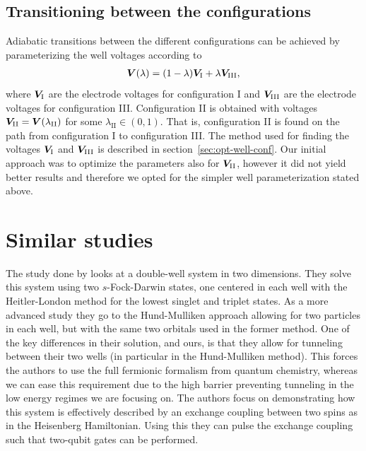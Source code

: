 \documentclass[twocolumn,superscriptaddress,unsortedaddress,
 amsmath,amssymb,
 aps,
]{revtex4-2}
\begin{document}
    \subsection{Transitioning between the configurations}
        Adiabatic transitions between the different configurations can be achieved by parameterizing the well voltages according to 
        \begin{align}
            \vb*{V}(\lambda) = (1-\lambda)\vb*{V}_\mathrm{I} + \lambda\vb*{V}_\mathrm{III},
            \label{eq:well-parameterization}
        \end{align}
        where $\vb*{V}_\mathrm{I}$ are the electrode voltages for configuration I and $\vb*{V}_\mathrm{III}$ are the electrode voltages for configuration III. Configuration II is obtained with voltages $\vb*{V}_\mathrm{II} = \vb*{V}(\lambda_\mathrm{II})$ for some $\lambda_\mathrm{II}\in(0,1)$. 
        That is, configuration II is found on the path from configuration I to configuration III. The method used for finding the voltages $\vb*{V}_\mathrm{I}$ and $\vb*{V}_\mathrm{III}$ is described in section~\ref{sec:opt-well-conf}. Our initial approach was to optimize the parameters also for $\vb*{V}_\mathrm{II}$, however it did not yield better results and therefore we opted for the simpler well parameterization stated above.
    

\section{Similar studies}
    The study done by \citet{Burkard1999} looks at a double-well system
    in two dimensions.
    They solve this system using two $s$-Fock-Darwin states,
    one centered in each well with the Heitler-London method for the
    lowest singlet and triplet states.
    As a more advanced study they go to the Hund-Mulliken approach
    allowing for two particles in each well, but with the same
    two orbitals used in the former method.
    One of the key differences in their solution, and ours, is that
    they allow for tunneling between their two wells (in particular in the
    Hund-Mulliken method).
    This forces the authors to use the full fermionic formalism from
    quantum chemistry, whereas we can ease this requirement due to
    the high barrier preventing tunneling in the low energy regimes
    we are focusing on.
    The authors focus on demonstrating how this system is
    effectively described by an exchange coupling between two spins
    as in the Heisenberg Hamiltonian.
    Using this they can pulse the exchange coupling such that
    two-qubit gates can be performed.
\end{document}
